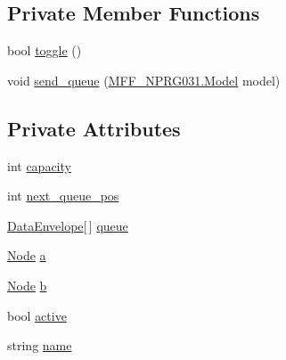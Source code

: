 \subsection*{Private Member Functions}
\begin{DoxyCompactItemize}
\item 
bool \hyperlink{classNetTrafficSimulator_1_1Link_a06d3c8e29b67ae95c9d854c97cf48d1e}{toggle} ()
\item 
void \hyperlink{classNetTrafficSimulator_1_1Link_a4ca4f2df795e1a3e814af806a176789d}{send\-\_\-queue} (\hyperlink{classMFF__NPRG031_1_1Model}{M\-F\-F\-\_\-\-N\-P\-R\-G031.\-Model} model)
\end{DoxyCompactItemize}
\subsection*{Private Attributes}
\begin{DoxyCompactItemize}
\item 
int \hyperlink{classNetTrafficSimulator_1_1Link_a24a004105c985c4e5ee64e4c839b1915}{capacity}
\item 
int \hyperlink{classNetTrafficSimulator_1_1Link_ae9f28a316a491bf4823314f5f794484a}{next\-\_\-queue\-\_\-pos}
\item 
\hyperlink{classNetTrafficSimulator_1_1Link_1_1DataEnvelope}{Data\-Envelope}\mbox{[}$\,$\mbox{]} \hyperlink{classNetTrafficSimulator_1_1Link_a0a9c8700a5fe5e22d7091587319886aa}{queue}
\item 
\hyperlink{classNetTrafficSimulator_1_1Node}{Node} \hyperlink{classNetTrafficSimulator_1_1Link_a4b7875d945423d1f64c31d8156a3308d}{a}
\item 
\hyperlink{classNetTrafficSimulator_1_1Node}{Node} \hyperlink{classNetTrafficSimulator_1_1Link_af85461b8b8d35adb1d8fc80849c0717d}{b}
\item 
bool \hyperlink{classNetTrafficSimulator_1_1Link_a1026cabe177ffe17054699706dea1452}{active}
\item 
string \hyperlink{classNetTrafficSimulator_1_1Link_af5a2835b585c255fbc6584f2f5388be8}{name}
\end{DoxyCompactItemize}


